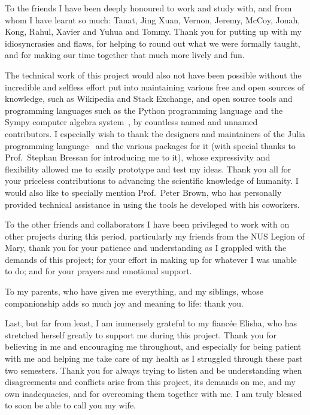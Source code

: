 \documentclass[10pt, a4paper]{article}
\numberwithin{equation}{section} %
\theoremstyle{definition}
\theoremstyle{plain}
\newcommand{\?}{\mathrel{?}} %
\begin{document}
    To the friends I have been deeply honoured to work and study with, and from whom I have learnt so much: Tanat, Jing Xuan, Vernon, Jeremy, McCoy, Jonah, Kong, Rahul, Xavier and Yuhua and Tommy. Thank you for putting up with my idiosyncrasies and flaws, for helping to round out what we were formally taught, and for making our time together that much more lively and fun.

    The technical work of this project would also not have been possible without the incredible and selfless effort put into maintaining various free and open sources of knowledge, such as Wikipedia and Stack Exchange, and open source tools and programming languages such as the Python programming language and the Sympy computer algebra system~\cite{Sympy}, by countless named and unnamed contributors. I especially wish to thank the designers and maintainers of the Julia programming language~\cite{Julia} and the various packages for it (with special thanks to Prof.\ Stephan Bressan for introducing me to it), whose expressivity and flexibility allowed me to easily prototype and test my ideas. Thank you all for your priceless contributions to advancing the scientific knowledge of humanity. I would also like to specially mention Prof.\ Peter Brown, who has personally provided technical assistance in using the tools he developed with his coworkers.

    To the other friends and collaborators I have been privileged to work with on other projects during this period, particularly my friends from the NUS Legion of Mary, thank you for your patience and understanding as I grappled with the demands of this project; for your effort in making up for whatever I was unable to do; and for your prayers and emotional support.

    To my parents, who have given me everything, and my siblings, whose companionship adds so much joy and meaning to life: thank you.

    Last, but far from least, I am immensely grateful to my fianc\'ee Elisha, who has stretched herself greatly to support me during this project. Thank you for believing in me and encouraging me throughout, and especially for being patient with me and helping me take care of my health as I struggled through these past two semesters. Thank you for always trying to listen and be understanding when disagreements and conflicts arise from this project, its demands on me, and my own inadequacies, and for overcoming them together with me. I am truly blessed to soon be able to call you my wife.
\end{document}
